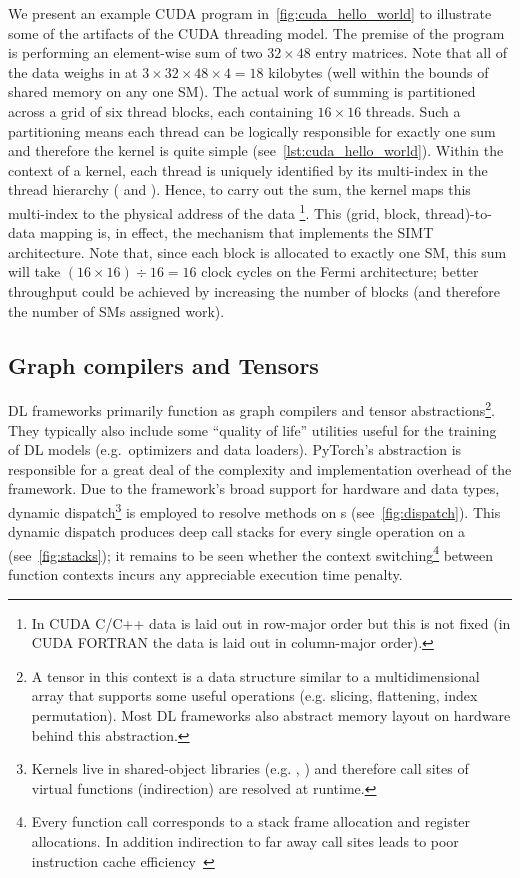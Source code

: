 We present an example CUDA program in~\cref{fig:cuda_hello_world} to illustrate some of the artifacts of the CUDA threading model.
The premise of the program is performing an element-wise sum of two $32 \times 48$ entry matrices.
Note that all of the data weighs in at  $3 \times 32 \times 48 \times 4 = 18$ kilobytes (well within the bounds of shared memory on any one SM).
The actual work of summing is partitioned across a grid of six thread blocks, each containing $16 \times 16$ threads.
Such a partitioning means each thread can be logically responsible for exactly one sum and therefore the kernel is quite simple (see~\cref{lst:cuda_hello_world}).
Within the context of a kernel, each thread is uniquely identified by its multi-index in the thread hierarchy ( and ).
Hence, to carry out the sum, the kernel maps this multi-index to the physical address of the data%
\footnote{In CUDA C/C++ data is laid out in row-major order but this is not fixed (in CUDA FORTRAN the data is laid out in column-major order).}.
This (grid, block, thread)-to-data mapping is, in effect, the mechanism that implements the SIMT architecture.
Note that, since each block is allocated to exactly one SM, this sum will take $\left( 16 \times 16 \right) \div 16 = 16$ clock cycles on the Fermi architecture;
better throughput could be achieved by increasing the number of blocks (and therefore the number of SMs assigned work).



\subsection{Graph compilers and Tensors}\label{subsec:graph-compilers}

DL frameworks primarily function as graph compilers and tensor abstractions\footnote{A tensor in this context is a data structure similar to a multidimensional array that supports some useful operations (e.g. slicing, flattening, index permutation). Most DL frameworks also abstract memory layout on hardware behind this abstraction.}.
They typically also include some ``quality of life'' utilities useful for the training of DL models (e.g.\ optimizers and data loaders).
PyTorch's  abstraction is responsible for a great deal of the complexity and implementation overhead of the framework.
Due to the framework's broad support for hardware and data types, dynamic dispatch\footnote{Kernels live in shared-object libraries (e.g. , ) and therefore call sites of virtual functions (indirection) are resolved at runtime.} is employed to resolve methods on s (see~\cref{fig:dispatch}).
This dynamic dispatch produces deep call stacks for every single operation on a  (see~\cref{fig:stacks}); it remains to be seen whether the context switching\footnote{Every function call corresponds to a stack frame allocation and register allocations. In addition indirection to far away call sites leads to poor instruction cache efficiency~\cite{10.5555/3314872.3314876}} between function contexts incurs any appreciable execution time penalty.

